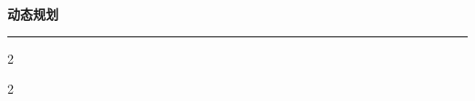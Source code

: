 \documentclass[10pt, a4paper]{article}
\begin{document}
\begin{center}
    \huge\textbf{动态规划}
\end{center}

\vspace{0.3cm}
\noindent\rule{\linewidth}{0.4pt}
\vspace{0.3cm}

\begin{multicols*}{2}
\setlength{\parskip}{3pt}
\normalsize

\end{multicols*}

\clearpage

\begin{multicols*}{2}


\par\columnbreak

\par\columnbreak

\par\columnbreak

\par\columnbreak

\par\columnbreak

\par\columnbreak

\par\columnbreak

\par\columnbreak

\par\columnbreak

\par\columnbreak

\par\columnbreak

\par\columnbreak

\par\columnbreak

\par\columnbreak

\par\columnbreak

\par\columnbreak

\par\columnbreak

\par\columnbreak


\end{multicols*}
\end{document}
